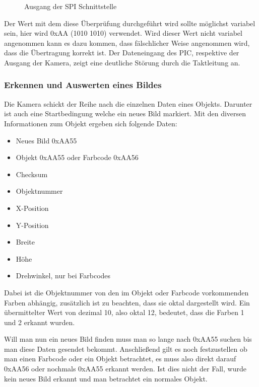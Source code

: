     \begin{figure}[tbh]
      \begin{centering}
      \par\end{centering}
      \caption{Ausgang der SPI Schnittstelle}
      \label{SPI-Ausgang}
    \end{figure}

    Der Wert mit dem diese Überprüfung durchgeführt wird sollte möglichst variabel sein, hier wird 0xAA (1010 1010) verwendet.
    Wird dieser Wert nicht variabel angenommen kann es dazu kommen, dass fälschlicher Weise angenommen wird, dass die Übertragung korrekt ist.
    Der Dateneingang des PIC, respektive der Ausgang der Kamera, zeigt eine deutliche Störung durch die Taktleitung an.

    \subsubsection{Erkennen und Auswerten eines Bildes}
    Die Kamera schickt der Reihe nach die einzelnen Daten eines Objekts. Darunter ist auch eine Startbedingung welche ein neues Bild markiert.
    Mit den diversen Informationen zum Objekt ergeben sich folgende Daten:
    \begin{itemize}
      \item Neues Bild 0xAA55
      \item Objekt 0xAA55 oder Farbcode 0xAA56
      \item Checksum
      \item Objektnummer
      \item X-Position
      \item Y-Position
      \item Breite
      \item Höhe
      \item Drehwinkel, nur bei Farbcodes
    \end{itemize}
    Dabei ist die Objektnummer von den im Objekt oder Farbcode vorkommenden Farben abhängig, zusätzlich ist zu beachten, dass sie oktal dargestellt wird.
    Ein übermittelter Wert von dezimal 10, also oktal 12, bedeutet, dass die Farben 1 und 2 erkannt wurden.

    Will man nun ein neues Bild finden muss man so lange nach 0xAA55 suchen bis man diese Daten gesendet bekommt.
    Anschließend gilt es noch festzustellen ob man einen Farbcode oder ein Objekt betrachtet,
    es muss also direkt darauf 0xAA56 oder nochmals 0xAA55 erkannt werden. Ist dies nicht der Fall, wurde kein neues Bild erkannt und man betrachtet ein normales Objekt.

